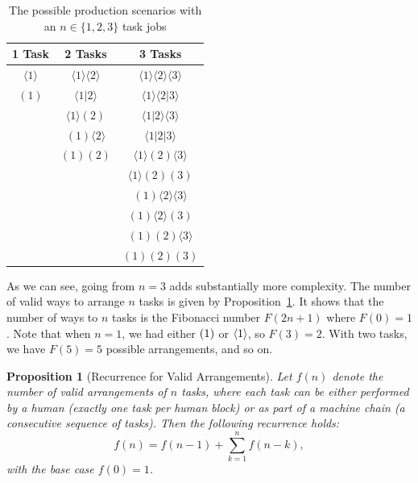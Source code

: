 \documentclass{article}
\theoremstyle{plain}
\theoremstyle{plain}
\newtheorem{proposition}[theorem]{Proposition}
\begin{document}
\begin{table}
  \centering
  \caption{The possible production scenarios with an $n \in \{1,2,3\}$ task jobs}
  \label{tab:tree}
  \begin{tabular}{ccc}
  \hline
  1 Task & 2 Tasks & 3 Tasks \\
  \hline
  $\langle 1 \rangle$ & $\langle 1 \rangle \langle 2 \rangle$ & $\langle 1 \rangle \langle 2 \rangle \langle 3 \rangle$ \\
  $(1)$ & $\langle 1|2 \rangle$ & $\langle 1 \rangle \langle 2|3 \rangle$ \\
  & $\langle 1 \rangle (2)$ & $\langle 1|2 \rangle \langle 3 \rangle$ \\
  & $(1) \langle 2 \rangle$ & $\langle 1|2|3 \rangle$ \\
  & $(1) (2)$ & $\langle 1 \rangle (2) \langle 3 \rangle$ \\
  & & $\langle 1 \rangle (2) (3)$ \\
  & & $(1) \langle 2 \rangle \langle 3 \rangle$ \\
  & & $(1) \langle 2 \rangle (3)$ \\
  & & $(1) (2) \langle 3 \rangle$ \\
  & & $(1) (2) (3)$ \\
  \hline
  \end{tabular}
  \end{table}

As we can see, going from $n=3$ adds substantially more complexity.
The number of valid ways to arrange $n$ tasks is given by Proposition~\ref{proposition:num_arrangements}.
It shows that the number of ways to $n$ tasks is the Fibonacci number $F(2n+1)$ where $F(0) = 1$.
Note that when $n=1$, we had either $( 1 )$ or $\langle 1 \rangle$, so $F(3) = 2$.
With two tasks, we have $F(5) = 5$ possible arrangements, and so on. 

\begin{proposition}[Recurrence for Valid Arrangements] \label{proposition:num_arrangements}
  Let $f(n)$ denote the number of valid arrangements of $n$ tasks, where each task can be either performed by a human (exactly one task per human block) or as part of a machine chain (a consecutive sequence of tasks). Then the following recurrence holds:
  \[
  f(n) = f(n-1) + \sum_{k=1}^{n} f(n-k),
  \]
  with the base case $f(0) = 1$.
  \end{proposition}
  
\end{document}
